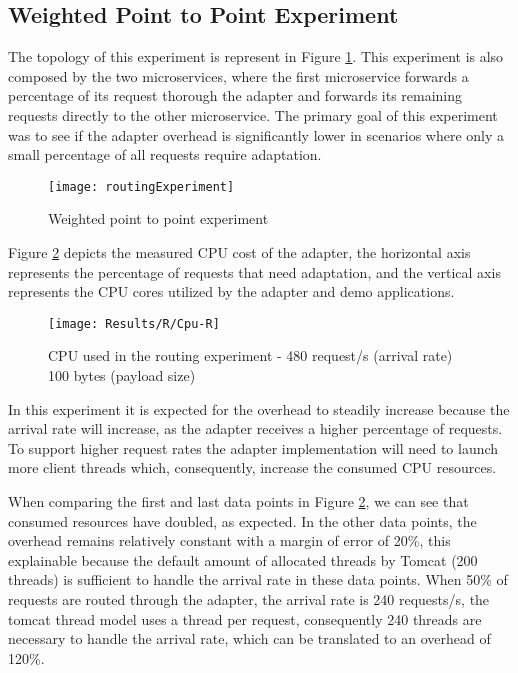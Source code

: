 \subsection{Weighted Point to Point Experiment}

The topology of this experiment is represent in Figure \ref{fig:routExp}.
This experiment is also composed by the two microservices, where the first microservice forwards a percentage of its request thorough the adapter
and forwards its remaining requests directly to the other microservice.
The primary goal of this experiment was to see if the adapter overhead is significantly lower in scenarios where only a small percentage of all requests require adaptation.

\begin{figure}[htbp]
    \centering
    \centerline{\texttt{[image: routingExperiment]}}
    \caption{Weighted point to point experiment}
    \label{fig:routExp}
\end{figure}

Figure \ref{fig:routCpu} depicts the measured CPU cost of the adapter, the horizontal axis represents the percentage of requests that need adaptation, and the vertical axis represents the
CPU cores utilized by the adapter and demo applications.

\begin{figure}[htbp]
    \centering
    \centerline{\texttt{[image: Results/R/Cpu-R]}}
    \caption{CPU used in the routing experiment - 480 request/s (arrival rate) 100 bytes (payload size)}
    \label{fig:routCpu}
\end{figure}

In this experiment it is expected for the overhead to steadily increase because the arrival rate will increase, as the adapter receives a higher percentage of requests. To support higher request rates
the adapter implementation will need to launch more client threads which, consequently, increase the consumed CPU resources.

When comparing the first and last data points in Figure \ref{fig:routCpu}, we can see that consumed resources have doubled, as expected.
In the other data points, the overhead remains relatively constant with a margin of error of 20\%,
this explainable because the default amount of allocated threads by Tomcat (200 threads) is sufficient to handle the arrival rate in these data points.
When 50\% of requests are routed through the adapter, the arrival rate is 240 requests/s, the tomcat thread model uses a thread per request,
consequently 240 threads are necessary to handle the arrival rate, which can be translated to an overhead of 120\%.

